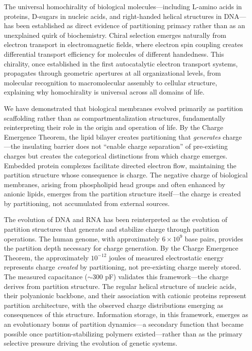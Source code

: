 \documentclass[12pt,a4paper]{article}
\begin{document}
The universal homochirality of biological molecules—including L-amino acids in proteins, D-sugars in nucleic acids, and right-handed helical structures in DNA—has been established as direct evidence of partitioning primacy rather than as an unexplained quirk of biochemistry. Chiral selection emerges naturally from electron transport in electromagnetic fields, where electron spin coupling creates differential transport efficiency for molecules of different handedness. This chirality, once established in the first autocatalytic electron transport systems, propagates through geometric apertures at all organizational levels, from molecular recognition to macromolecular assembly to cellular structure, explaining why homochirality is universal across all domains of life.

We have demonstrated that biological membranes evolved primarily as partition scaffolding rather than as compartmentalization structures, fundamentally reinterpreting their role in the origin and operation of life. By the Charge Emergence Theorem, the lipid bilayer creates partitioning that \emph{generates} charge---the insulating barrier does not ``enable charge separation'' of pre-existing charges but creates the categorical distinctions from which charge emerges. Embedded protein complexes facilitate directed electron flow, maintaining the partition structure whose consequence is charge. The negative charge of biological membranes, arising from phospholipid head groups and often enhanced by anionic lipids, emerges from the partition structure itself---the charge is created by partitioning, not accumulated from external sources.

The evolution of DNA and RNA has been reinterpreted as the evolution of partition structures that generate and stabilize charge through partition operations. The human genome, with approximately $6 \times 10^9$ base pairs, provides the partition depth necessary for charge generation. By the Charge Emergence Theorem, the approximately $10^{-12}$ joules of measured electrostatic energy represents charge \emph{created} by partitioning, not pre-existing charge merely stored. The measured capacitance ($\sim 300$ pF) validates this framework---the charge derives from partition structure. The regular helical structure of nucleic acids, their polyanionic backbone, and their association with cationic proteins represent partition architecture, with the observed charge distributions emerging as consequences of this structure. Information storage, in this framework, emerges as an evolutionary bonus of partition dynamics---a secondary function that became possible once partition-stabilizing polymers existed---rather than as the primary selective pressure driving the evolution of genetic systems.
\end{document}
